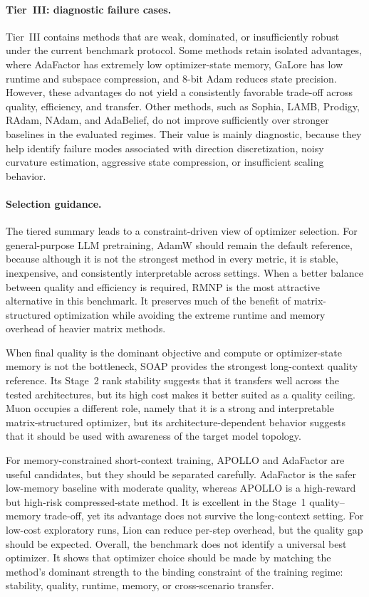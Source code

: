 \paragraph{Tier~III: diagnostic failure cases.}
Tier~III contains methods that are weak, dominated, or insufficiently robust
under the current benchmark protocol. Some methods retain isolated advantages, where
AdaFactor has extremely low optimizer-state memory, GaLore has low runtime and
subspace compression, and 8-bit Adam reduces state precision. However, these
advantages do not yield a consistently favorable trade-off across quality,
efficiency, and transfer. Other methods, such as Sophia, LAMB, Prodigy, RAdam,
NAdam, and AdaBelief, do not improve sufficiently over stronger baselines in
the evaluated regimes. Their value is mainly diagnostic, because they help identify
failure modes associated with direction discretization, noisy curvature
estimation, aggressive state compression, or insufficient scaling behavior.


\paragraph{Selection guidance.}
The tiered summary leads to a constraint-driven view of optimizer selection.
For general-purpose LLM pretraining, AdamW should remain the default reference, because although it is not the
strongest method in every metric, it is stable, inexpensive,
and consistently interpretable across settings. When a better balance between
quality and efficiency is required, RMNP is the most attractive alternative in
this benchmark. It preserves much of the benefit of matrix-structured
optimization while avoiding the extreme runtime and memory overhead of heavier
matrix methods.

When final quality is the dominant objective and compute or optimizer-state
memory is not the bottleneck, SOAP provides the strongest long-context quality
reference. Its Stage~2 rank stability suggests that it transfers well across
the tested architectures, but its high cost makes it better suited as a
quality ceiling. Muon occupies a different
role, namely that it is a strong and interpretable matrix-structured optimizer, but its
architecture-dependent behavior suggests that it should be used with awareness
of the target model topology.

For memory-constrained short-context training, APOLLO and AdaFactor are useful
candidates, but they should be separated carefully. AdaFactor is the safer
low-memory baseline with moderate quality, whereas APOLLO is a high-reward but
high-risk compressed-state method. It is excellent in the Stage~1
quality--memory trade-off, yet its advantage does not survive the long-context
setting. For low-cost exploratory runs, Lion can reduce per-step overhead, but
the quality gap should be expected. Overall, the benchmark does not identify a
universal best optimizer. It shows that optimizer choice should be made by
matching the method's dominant strength to the binding constraint of the
training regime: stability, quality, runtime, memory, or cross-scenario
transfer.


